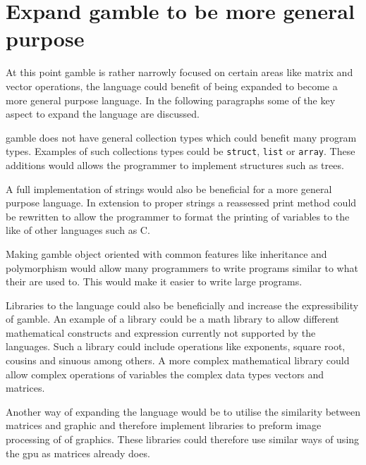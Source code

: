 \section{Expand \gls{gamble} to be more general purpose}
At this point \gls{gamble} is rather narrowly focused on certain areas like matrix and vector operations, the language could benefit of being expanded to become a more general purpose language.
In the following paragraphs some of the key aspect to expand the language are discussed.

\gls{gamble} does not have general collection types which could benefit many program types.
Examples of such collections types could be \texttt{struct}, \texttt{list} or \texttt{array}.
These additions would allows the programmer to implement structures such as trees.

A full implementation of strings would also be beneficial for a more general purpose language.
In extension to proper strings a reassessed print method could be rewritten to allow the programmer to format the printing of variables to the like of other languages such as C.

Making \gls{gamble} object oriented with common features like inheritance and polymorphism would allow many programmers to write programs similar to what their are used to.
This would make it easier to write large programs.

Libraries to the language could also be beneficially and increase the expressibility of \gls{gamble}.
An example of a library could be a math library to allow different mathematical constructs and expression currently not supported by the languages.
Such a library could include operations like exponents, square root, cousins and sinuous among others.
A more complex mathematical library could allow complex operations of variables the complex data types vectors and matrices.

Another way of expanding the language would be to utilise the similarity between matrices and graphic and therefore implement libraries to preform image processing of of graphics.
These libraries could therefore use similar ways of using the \acrshort{gpu} as matrices already does.